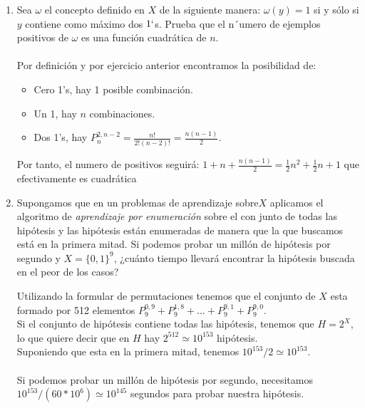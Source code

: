 \documentclass{article}
\begin{document}
\begin{enumerate}
    \item Sea \(\omega\) el concepto definido en \(X\) de la siguiente manera: \(\omega(y) = 1\) si y sólo si \(y\) contiene como máximo dos \(1`\)s. Prueba que el n´umero de ejemplos positivos de \(\omega\) es una función cuadrática de \(n\).
    \\\\Por definición y por ejercicio anterior encontramos la posibilidad de:
    \begin{itemize}
        \item Cero 1's, hay 1 posible combinación.
        \item Un 1, hay \(n\) combinaciones.
        \item Dos 1's, hay \(P_{n}^{2,n-2}=\frac{n!}{2!(n-2)!}=\frac{n(n-1)}{2}\).
    \end{itemize}

     \begin{center}
         Por tanto, el numero de positivos seguirá: \(1+n+\frac{n(n-1)}{2}= \frac{1}{2}n^2+\frac{1}{2}n+1\) que efectivamente es cuadrática
     \end{center}
    
    \item Supongamos que en un problemas de aprendizaje sobre\(X\) aplicamos el algoritmo de \textit{aprendizaje por enumeración} sobre el con junto de todas las hipótesis y las hipótesis están enumeradas de manera que la que buscamos está en la primera mitad. Si podemos probar un millón de hipótesis por segundo y \(X = \{0, 1\}^9\), ¿cuánto tiempo llevará encontrar la hipótesis buscada en el peor de los casos?
    
    Utilizando la formular de permutaciones tenemos que el conjunto de \(X\) esta formado por 512 elementos \(P_{9}^{0,9}+P_{9}^{1,8}+\ldots+P_{9}^{9,1}+P_{9}^{9,0}\).
    \\Si el conjunto de hipótesis contiene todas las hipótesis, tenemos que \(H = 2^X\), lo que quiere decir que en \(H\) hay \(2^{512} \simeq 10^{153}\) hipótesis.
    \\Suponiendo que esta en la primera mitad, tenemos \(10^{153}/2 \simeq 10^{153}\).
    \\\\Si podemos probar un millón de hipótesis por segundo, necesitamos \(10^{153}/(60*10^6) \simeq 10^{145}\) segundos para probar nuestra hipótesis.
\end{enumerate}
\end{document}
